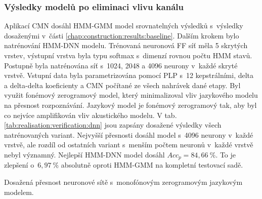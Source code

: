 \subsubsection{Výsledky modelů po eliminaci vlivu kanálu}

Aplikací CMN dosáhl HMM-GMM model srovnatelných výsledků s~výsledky dosaženými v~části \ref{chap:construction:results:baseline}.
Dalším krokem bylo natrénování HMM-DNN modelu.
Trénovaná neuronová FF síť měla 5 skrytých vrstev, výstupní vrstva byla typu softmax s~dimenzí rovnou počtu HMM stavů.
Postupně byla natrénována síť s~1024, 2048 a 4096 neurony v~každé skryté vrstvě.
Vstupní data byla parametrizována pomocí PLP s~12 kepstrálními, delta a delta-delta koeficienty a CMN počítané ze všech nahrávek dané etapy.
Byl využit fonémový zerogramový model, který minimalizoval vliv jazykového modelu na přesnost rozpoznávání.
Jazykový model je fonémový zerogramový tak, aby byl co nejvíce amplifikován vliv akustického modelu.
V tab. \ref{tab:realisation:verification:dnn} jsou zapsány dosažené výsledky všech natrénovaných variant.
Nejvyšší přesnosti dosáhl model s~4096 neurony v~každé vrstvě, ale rozdíl od ostatních variant s~menším počtem neuronů v~každé vrstvě nebyl významný.
Nejlepší HMM-DNN model dosáhl $Acc_{p} = 84,66~\%$.
To je zlepšení o~$6,97~\%$ absolutně oproti HMM-GMM na kompletní testovací sadě.

\begin{table}[htpb]
  \centering
  \def\arraystretch{1.5}
  \caption[Přesnost neuronové sítě s~monofónovým zerogramovým LM.]{Dosažená přesnost neuronové sítě s~monofónovým zerogramovým jazykovým modelem.}
  \label{tab:realisation:verification:dnn}
\end{table}
